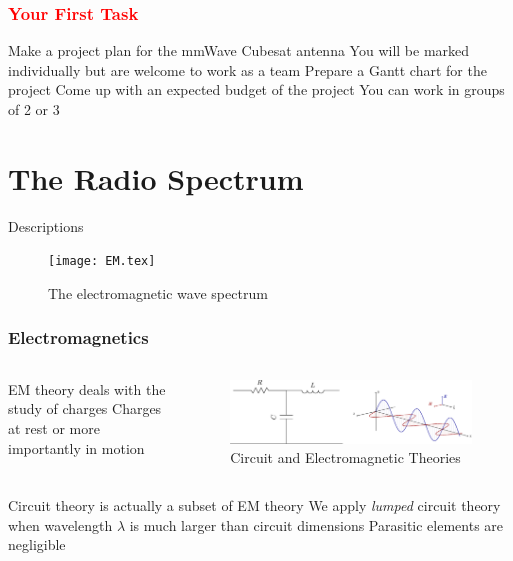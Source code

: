 \documentclass[10pt, compress]{beamer}
\begin{document}
\begin{frame}[fragile]
  \frametitle{\textcolor{red}{Your First Task}}
  \begin{outline}
    \1 Make a project plan for the mmWave Cubesat antenna
    \1 You will be marked individually but are welcome to work as a team
    \1 Prepare a Gantt chart for the project
    \1 Come up with an expected budget of the project
    \1 You can work in groups of 2 or 3
  \end{outline}
\end{frame}
\section{The Radio Spectrum}
\begin{frame}{Descriptions}
  \begin{figure}[t!]
  \centering
        {\texttt{[image: EM.tex]}
        \label{fig:EM}}
        \caption{The electromagnetic wave spectrum}
      \end{figure}
\end{frame}
\begin{frame}
  \frametitle{Electromagnetics}
 \begin{columns}[T] %
  \begin{column}{.4\textwidth}
    \begin{outline}
    \1 EM theory deals with the study of charges
    \1 Charges at rest or more importantly in motion
  \end{outline}
   \end{column}
 \begin{column}[T]{.6\textwidth}
    \begin{figure}
      \centering
          \includegraphics[width=1.0\textwidth]{em_vs_ckt.pdf}
      \caption{Circuit and Electromagnetic Theories}
    \end{figure}
      \end{column}%
\end{columns}
\begin{outline}
  \1 Circuit theory is actually a subset of EM theory
  \1 We apply \textit{lumped} circuit theory when wavelength $\lambda$ is much larger than circuit dimensions
  \2 Parasitic elements are negligible
\end{outline}
\end{frame}
\end{document}
